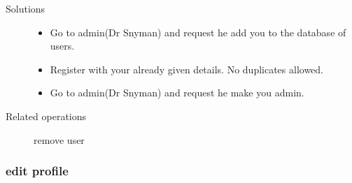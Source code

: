 \documentclass[a4paper]{article}
\begin{document}
\begin{description}
\begin{itemize}
	\end{itemize}
\item[Solutions]\hfill
	\begin{itemize}
	\item Go to admin(Dr Snyman) and request he add you to the database of users.
	\item Register with your already given details. No duplicates allowed.
	\item  Go to admin(Dr Snyman) and request he make you admin.
	\end{itemize}
\item[Related operations] remove user
\end{description}
	  
\subsubsection{edit profile}
\end{document}
